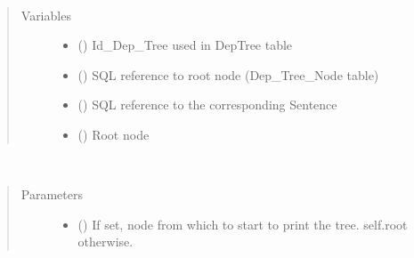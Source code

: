 \documentclass[letterpaper,10pt,english]{sphinxmanual}
\begin{document}
\begin{fulllineitems}
\label{\detokenize{classes:loacore.classes.classes.DepTree}}~\begin{quote}\begin{description}
\item[{Variables}] \leavevmode\begin{itemize}
\item {} 
 () \textendash{} Id\_Dep\_Tree used in DepTree table

\item {} 
 () \textendash{} SQL reference to root node (Dep\_Tree\_Node table)

\item {} 
 () \textendash{} SQL reference to the corresponding Sentence

\item {} 
 ({\hyperref[\detokenize{classes:loacore.classes.classes.DepTreeNode}]{}}) \textendash{} Root node

\end{itemize}

\end{description}\end{quote}

\begin{fulllineitems}
\label{\detokenize{classes:loacore.classes.classes.DepTree.dep_tree_str}}~\begin{quote}\begin{description}
\item[{Parameters}] \leavevmode\begin{itemize}
\item {} 
 ({\hyperref[\detokenize{classes:loacore.classes.classes.DepTreeNode}]{}}) \textendash{} If set, node from which to start to print the tree. self.root otherwise.


\end{itemize}
\end{description}
\end{quote}
\end{fulllineitems}
\end{fulllineitems}
\end{document}
